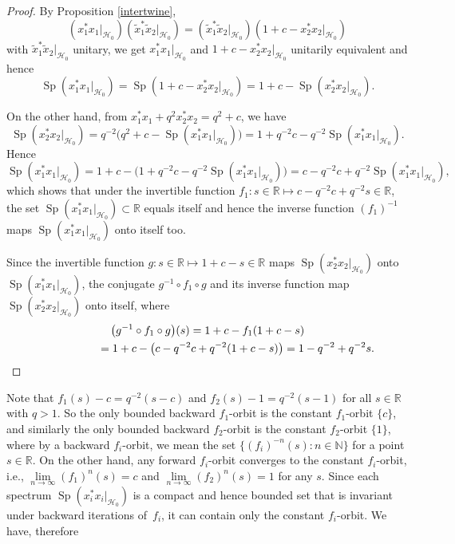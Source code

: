 \begin{proof} By Proposition \ref{intertwine},
\[
( x_{1}^{\ast}x_{1}|_{\mathcal{H}_{0}}) ( \tilde{x}%
_{1}^{\ast}\tilde{x}_{2}|_{\mathcal{H}_{0}}) =( \tilde{x}%
_{1}^{\ast}\tilde{x}_{2}|_{\mathcal{H}_{0}}) ( 1+c-x_{2}^{\ast
}x_{2}|_{\mathcal{H}_{0}})
\]
with $\tilde{x}_{1}^{\ast}\tilde{x}_{2}|_{\mathcal{H}_{0}}$ unitary, we get
$x_{1}^{\ast}x_{1}|_{\mathcal{H}_{0}}$ and $1+c-x_{2}^{\ast}x_{2}%
|_{\mathcal{H}_{0}}$ unitarily equivalent and hence
\[
\operatorname{Sp}( x_{1}^{\ast}x_{1}|_{\mathcal{H}_{0}})
=\operatorname{Sp}( 1+c-x_{2}^{\ast}x_{2}|_{\mathcal{H}_{0}})
=1+c-\operatorname{Sp}( x_{2}^{\ast}x_{2}|_{\mathcal{H}_{0}}) .
\]

On the other hand, from $x_{1}^{\ast}x_{1}+q^{2}x_{2}^{\ast}x_{2}=q^{2}+c$, we
have
\[
\operatorname{Sp}( x_{2}^{\ast}x_{2}|_{\mathcal{H}_{0}})
=q^{-2}\big( q^{2}+c-\operatorname{Sp}( x_{1}^{\ast}x_{1}
|_{\mathcal{H}_{0}}) \big) =1+q^{-2}c-q^{-2}\operatorname{Sp}
( x_{1}^{\ast}x_{1}|_{\mathcal{H}_{0}}) .
\]
Hence
\[
\operatorname{Sp}( x_{1}^{\ast}x_{1}|_{\mathcal{H}_{0}})
=1+c-\big( 1+q^{-2}c-q^{-2}\operatorname{Sp}( x_{1}^{\ast}
x_{1}|_{\mathcal{H}_{0}}) \big) =c-q^{-2}c+q^{-2}\operatorname{Sp}
( x_{1}^{\ast}x_{1}|_{\mathcal{H}_{0}}) ,
\]
which shows that under the invertible function $f_{1}\colon s\in\mathbb{R}\mapsto
c-q^{-2}c+q^{-2}s\in\mathbb{R}$, the set $\operatorname{Sp}(
x_{1}^{\ast}x_{1}|_{\mathcal{H}_{0}}) \subset\mathbb{R}$ equals itself
and hence the inverse function $( f_{1}) ^{-1}$ maps
$\operatorname{Sp}( x_{1}^{\ast}x_{1}|_{\mathcal{H}_{0}}) $ onto
itself too.

Since the invertible function $g\colon s\in\mathbb{R}\mapsto1+c-s\in\mathbb{R}$ maps
$\operatorname{Sp}( x_{2}^{\ast}x_{2}|_{\mathcal{H}_{0}}) $ onto
$\operatorname{Sp}( x_{1}^{\ast}x_{1}|_{\mathcal{H}_{0}}) $, the
conjugate $g^{-1}\circ f_{1}\circ g$ and its inverse function map
$\operatorname{Sp}( x_{2}^{\ast}x_{2}|_{\mathcal{H}_{0}}) $ onto
itself, where
\begin{gather*}
\big( g^{-1}\circ f_{1}\circ g\big) (s) =1+c-f_{1}(1+c-s)\\
\hphantom{\big( g^{-1}\circ f_{1}\circ g\big) (s)}{}
=1+c-\big( c-q^{-2}c+q^{-2} ( 1+c-s ) \big) =1-q^{-2}%
+q^{-2}s.\tag*{\qed}
\end{gather*}\renewcommand{\qed}{}
\end{proof}

Note that $f_{1}(s) -c=q^{-2}(s-c) $ and
$f_{2}(s) -1=q^{-2}(s-1) $ for all $s\in
\mathbb{R}$ with $q>1$. So the only bounded backward $f_{1}$-orbit is the
constant $f_{1}$-orbit $\{c\} $, and similarly the only bounded
backward $f_{2}$-orbit is the constant $f_{2}$-orbit $\{1\} $,
where by a backward $f_{i}$-orbit, we mean the set $ \{ (
f_{i} ) ^{-n}(s) \colon n\in\mathbb{N} \} $ for a point
$s\in\mathbb{R}$. On the other hand, any forward $f_{i}$-orbit converges to
the constant $f_{i}$-orbit, i.e., $\lim\limits_{n\rightarrow\infty}(
f_{1}) ^{n}(s) =c$ and $\lim\limits_{n\rightarrow\infty}(
f_{2}) ^{n}(s) =1$ for any $s$. Since each spectrum $\operatorname{Sp}( x_{i}^{\ast}%
x_{i}|_{\mathcal{H}_{0}}) $ is a compact and hence bounded set that is
invariant under backward iterations of~$f_{i}$, it can contain only the
constant $f_{i}$-orbit. We have, therefore

